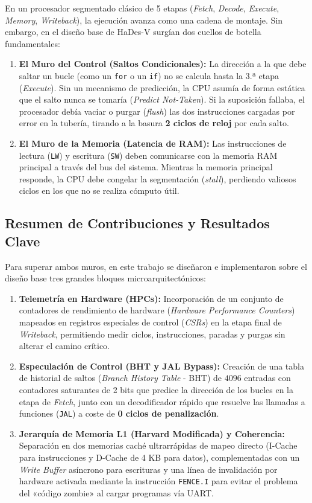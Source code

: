 \documentclass[10pt,a4paper]{article}
\begin{document}
En un procesador segmentado clásico de 5 etapas (\textit{Fetch}, \textit{Decode}, \textit{Execute}, \textit{Memory}, \textit{Writeback}), la ejecución avanza 
como una cadena de montaje. Sin embargo, en el diseño base de HaDes-V surgían dos cuellos de botella fundamentales:

\begin{enumerate}
    \item \textbf{El Muro del Control (Saltos Condicionales):} La dirección a la que debe saltar un bucle (como un \texttt{for} o un \texttt{if}) no se calcula
    hasta la 3.ª etapa (\textit{Execute}). Sin un mecanismo de predicción, la CPU asumía de forma estática que el salto nunca se tomaría
    (\textit{Predict Not-Taken}). Si la suposición fallaba, el procesador debía vaciar o purgar (\textit{flush}) las dos instrucciones cargadas por error en la
    tubería, tirando a la basura \textbf{2 ciclos de reloj} por cada salto.
    \item \textbf{El Muro de la Memoria (Latencia de RAM):} Las instrucciones de lectura (\texttt{LW}) y escritura (\texttt{SW}) deben comunicarse con la memoria
    RAM principal a través del bus del sistema. Mientras la memoria principal responde, la CPU debe congelar la segmentación (\textit{stall}), perdiendo valiosos
    ciclos en los que no se realiza cómputo útil.
\end{enumerate}

\subsection{Resumen de Contribuciones y Resultados Clave}
Para superar ambos muros, en este trabajo se diseñaron e implementaron sobre el diseño base tres grandes bloques microarquitectónicos:

\begin{enumerate}
    \item \textbf{Telemetría en Hardware (HPCs):} Incorporación de un conjunto de contadores de rendimiento de hardware (\textit{Hardware Performance Counters})
    mapeados en registros especiales de control (\textit{CSRs}) en la etapa final de \textit{Writeback}, permitiendo medir ciclos, instrucciones, paradas y purgas
    sin alterar el camino crítico.
    \item \textbf{Especulación de Control (BHT y JAL Bypass):} Creación de una tabla de historial de saltos (\textit{Branch History Table} - BHT) de $4096$
    entradas con contadores saturantes de 2 bits que predice la dirección de los bucles en la etapa de \textit{Fetch}, junto con un decodificador rápido que
    resuelve las llamadas a funciones (\texttt{JAL}) a coste de \textbf{0 ciclos de penalización}.
    \item \textbf{Jerarquía de Memoria L1 (Harvard Modificada) y Coherencia:} Separación en dos memorias caché ultrarrápidas de mapeo directo (I-Cache para
    instrucciones y D-Cache de 4 KB para datos), complementadas con un \textit{Write Buffer} asíncrono para escrituras y una línea de invalidación por hardware 
    activada mediante la instrucción \texttt{FENCE.I} \cite{riscv_spec} para evitar el problema del «código zombie» al cargar programas vía UART.
\end{enumerate}
\end{document}
